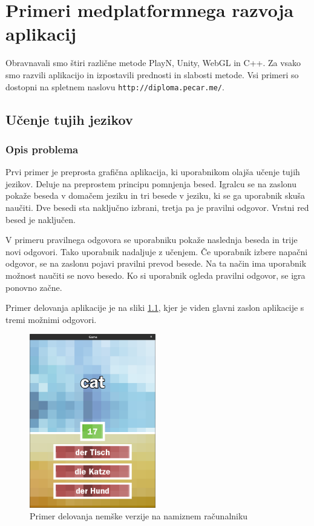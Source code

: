 \chapter{Primeri medplatformnega razvoja aplikacij}

Obravnavali smo štiri različne metode PlayN, Unity, WebGL in C++. Za vsako smo razvili aplikacijo in izpostavili prednosti in slabosti metode. Vsi primeri so dostopni na spletnem naslovu \texttt{http://diploma.pecar.me/}.

\section{Učenje tujih jezikov}

\subsection{Opis problema}

Prvi primer je preprosta grafična aplikacija, ki uporabnikom olajša učenje tujih jezikov. Deluje na preprostem principu pomnjenja besed. Igralcu se na zaslonu pokaže beseda v domačem jeziku in tri besede v jeziku, ki se ga uporabnik skuša naučiti. Dve besedi sta naključno izbrani, tretja pa je pravilni odgovor. Vrstni red besed je naključen.

V primeru pravilnega odgovora se uporabniku pokaže naslednja beseda in trije novi odgovori. Tako uporabnik nadaljuje z učenjem. Če uporabnik izbere napačni odgovor, se na zaslonu pojavi pravilni prevod besede. Na ta način ima uporabnik možnost naučiti se novo besedo. Ko si uporabnik ogleda pravilni odgovor, se igra ponovno začne.

Primer delovanja aplikacije je na sliki \ref{german}, kjer je viden glavni zaslon aplikacije s tremi možnimi odgovori.

\begin{figure}
\begin{center}
\includegraphics[width=5.5cm]{pic/defg-german.png}
\end{center}
\caption{Primer delovanja nemške verzije na namiznem računalniku}
\label{german}
\end{figure} 


